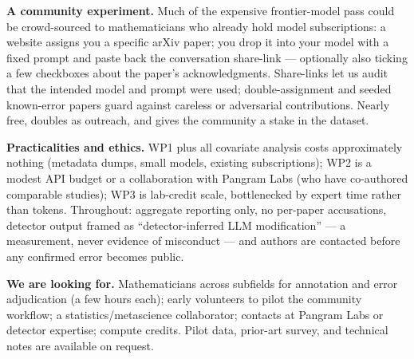 \documentclass[10pt]{article}
\newcommand{\head}[1]{\vspace{2pt}\textbf{#1}\enspace}
\begin{document}
\head{A community experiment.}
Much of the expensive frontier-model pass could be crowd-sourced to mathematicians who already hold model subscriptions: a website assigns you a specific arXiv paper; you drop it into your model with a fixed prompt and paste back the conversation share-link --- optionally also ticking a few checkboxes about the paper's acknowledgments. Share-links let us audit that the intended model and prompt were used; double-assignment and seeded known-error papers guard against careless or adversarial contributions. Nearly free, doubles as outreach, and gives the community a stake in the dataset.

\head{Practicalities and ethics.}
WP1 plus all covariate analysis costs approximately nothing (metadata dumps, small models, existing subscriptions); WP2 is a modest API budget or a collaboration with Pangram Labs (who have co-authored comparable studies); WP3 is lab-credit scale, bottlenecked by expert time rather than tokens. Throughout: aggregate reporting only, no per-paper accusations, detector output framed as ``detector-inferred LLM modification'' --- a measurement, never evidence of misconduct --- and authors are contacted before any confirmed error becomes public.

\head{We are looking for.}
Mathematicians across subfields for annotation and error adjudication (a few hours each); early volunteers to pilot the community workflow; a statistics/metascience collaborator; contacts at Pangram Labs or detector expertise; compute credits. Pilot data, prior-art survey, and technical notes are available on request.
\end{document}
